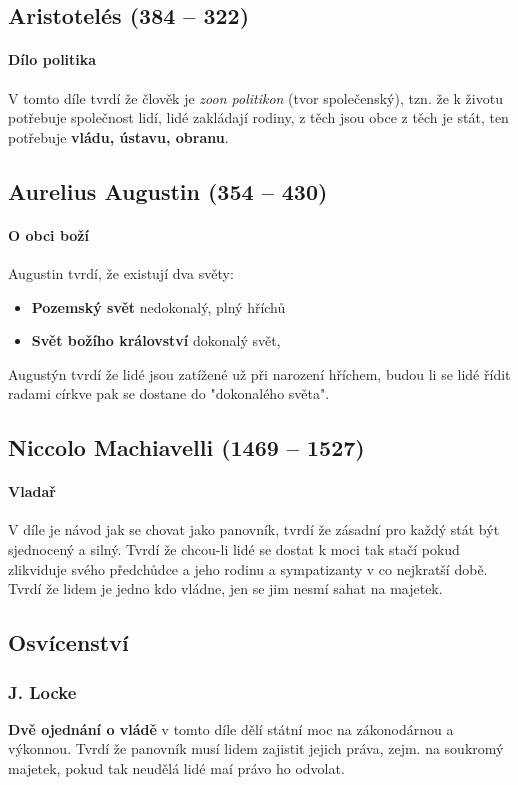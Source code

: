 \documentclass[10pt,a4paper,
twoside,%
]{report}
\begin{document}
\subsection[Aristotelés]{Aristotelés (384 -- 322)}

\paragraph{Dílo politika} V tomto díle tvrdí že člověk je \emph{zoon politikon} (tvor společenský), tzn. že k životu potřebuje společnost lidí, lidé zakládají rodiny, z těch jsou obce z těch je stát, ten potřebuje \textbf{vládu, ústavu, obranu}.


\subsection{Aurelius Augustin (354 -- 430)}
\paragraph{O obci boží} Augustin tvrdí, že existují dva světy:
\begin{itemize}
\item \textbf{Pozemský svět} nedokonalý, plný hříchů
\item \textbf{Svět božího království} dokonalý svět, 
\end{itemize}
Augustýn tvrdí že lidé jsou zatížené už při narození hříchem, budou li se lidé řídit radami církve pak se dostane do "dokonalého světa".

\subsection[N. Machiavelli]{Niccolo Machiavelli (1469 -- 1527)}

\paragraph{Vladař} V díle je návod jak se chovat jako panovník, tvrdí že zásadní pro každý stát být sjednocený a silný. Tvrdí že chcou-li lidé se dostat k moci tak stačí pokud zlikviduje svého předchůdce a jeho rodinu a sympatizanty v co nejkratší době. Tvrdí že lidem je jedno kdo vládne, jen se jim nesmí sahat na majetek. 

\subsection{Osvícenství}
\subsubsection{J. Locke}
\textbf{Dvě ojednání o vládě} v tomto díle dělí státní moc na zákonodárnou a výkonnou. Tvrdí že panovník musí lidem zajistit jejich práva, zejm. na soukromý majetek, pokud tak neudělá lidé maí právo ho odvolat.
\end{document}
